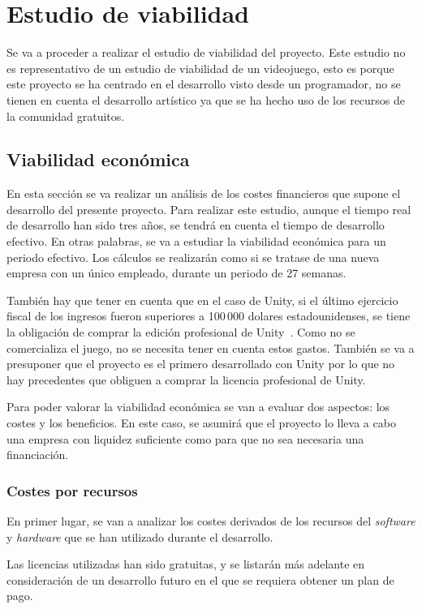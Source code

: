 \section{Estudio de viabilidad}
Se va a proceder a realizar el estudio de viabilidad del proyecto. Este estudio no es representativo de un estudio de viabilidad de un videojuego, esto es porque este proyecto se ha centrado en el desarrollo visto desde un programador, no se tienen en cuenta el desarrollo artístico ya que se ha hecho uso de los recursos de la comunidad gratuitos.


\subsection{Viabilidad económica}
En esta sección se va realizar un análisis de los costes financieros que supone el desarrollo del presente proyecto. Para realizar este estudio, aunque el tiempo real de desarrollo han sido tres años, se tendrá en cuenta el tiempo de desarrollo efectivo. En otras palabras, se va a estudiar la viabilidad económica para un periodo efectivo. Los cálculos se realizarán como si se tratase de una nueva empresa con un único empleado, durante un periodo de 27 semanas.

También hay que tener en cuenta que en el caso de Unity, si el último ejercicio fiscal de los ingresos fueron superiores a 100\,000 dolares estadounidenses, se tiene la obligación de comprar la edición profesional de Unity~\cite{unity}. Como no se comercializa el juego, no se necesita tener en cuenta estos gastos. También se va a presuponer que el proyecto es el primero desarrollado con Unity por lo que no hay precedentes que obliguen a comprar la licencia profesional de Unity.

Para poder valorar la viabilidad económica se van a evaluar dos aspectos: los costes y los beneficios. En este caso, se asumirá que el proyecto lo lleva a cabo una empresa con liquidez suficiente como para que no sea necesaria una financiación.

\subsubsection{Costes por recursos}
En primer lugar, se van a analizar los costes derivados de los recursos del \textit{software} y \textit{hardware} que se han utilizado durante el desarrollo.

Las licencias utilizadas han sido gratuitas, y se listarán más adelante en consideración de un desarrollo futuro en el que se requiera obtener un plan de pago. 

